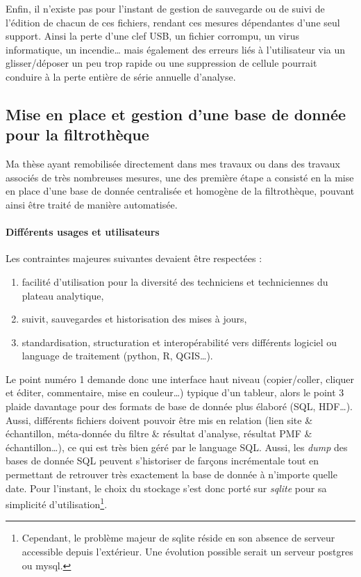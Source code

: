 Enfin, il n'existe pas pour l'instant de gestion de sauvegarde ou de suivi de l'édition
de chacun de ces fichiers, rendant ces mesures dépendantes d'une seul support. Ainsi la perte
d'une clef USB, un fichier corrompu, un virus informatique, un incendie… mais également
des erreurs liés à l'utilisateur via un glisser/déposer un peu trop rapide ou une
suppression de cellule pourrait conduire à la perte entière de série annuelle d'analyse.

\subsection{Mise en place et gestion d'une base de donnée pour la filtrothèque}%
\label{sub:mise_en_place_et_gestion_d_une_base_de_donnée_pour_la_filtrothèque}

Ma thèse ayant remobilisée directement dans mes travaux ou dans des travaux associés de
très nombreuses mesures, une des première étape a consisté en la mise en place d'une base
de donnée centralisée et homogène de la filtrothèque, pouvant ainsi être traité de manière
automatisée.

\paragraph{Différents usages et utilisateurs}%
\label{par:différents_usages_et_utilisateurs}

Les contraintes majeures suivantes devaient être respectées :
\begin{enumerate}
    \item facilité d'utilisation pour la diversité des techniciens et techniciennes du
        plateau analytique,
    \item suivit, sauvegardes et historisation des mises à jours,
    \item standardisation, structuration et interopérabilité vers différents logiciel ou
        language de traitement (python, R, QGIS…).
\end{enumerate}
Le point numéro 1 demande donc une interface haut niveau (copier/coller, cliquer et
éditer, commentaire, mise en couleur…) typique d'un tableur, alors le point 3 plaide
davantage pour des formats de base de donnée plus élaboré (SQL, HDF…).
Aussi, différents fichiers doivent pouvoir être mis en relation (lien site \& échantillon, méta-donnée du
filtre \& résultat d'analyse, résultat PMF \& échantillon…), ce qui est très bien géré
par le language SQL. Aussi, les \textit{dump} des bases de donnée SQL peuvent s'historiser
de farçons incrémentale tout en permettant de retrouver très exactement la base de donnée à
n'importe quelle date. 
Pour l'instant, le choix du stockage s'est donc porté sur \textit{sqlite} pour sa
simplicité d'utilisation\footnote{Cependant, le problème majeur de sqlite réside en son
    absence de serveur accessible depuis l'extérieur. Une évolution possible serait un
serveur postgres ou mysql.}.

